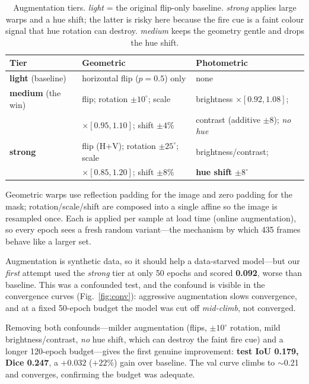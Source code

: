\documentclass[10pt]{article}
\begin{document}
\begin{table}[H]
\centering\small
\begin{tabular}{lll}
\toprule
Tier & Geometric & Photometric \\
\midrule
\textbf{light} (baseline) & horizontal flip ($p=0.5$) only & none \\
\textbf{medium} (the win) & flip; rotation $\pm10^\circ$; scale & brightness $\times[0.92,1.08]$; \\
 & $\times[0.95,1.10]$; shift $\pm4\%$ & contrast (additive $\pm8$); \emph{no hue} \\
\textbf{strong} & flip (H+V); rotation $\pm25^\circ$; scale & brightness/contrast; \\
 & $\times[0.85,1.20]$; shift $\pm8\%$ & \textbf{hue shift} $\pm8^\circ$ \\
\bottomrule
\end{tabular}
\caption{Augmentation tiers. \emph{light} = the original flip-only baseline.
\emph{strong} applies large warps and a hue shift; the latter is risky here
because the fire cue is a faint colour signal that hue rotation can destroy.
\emph{medium} keeps the geometry gentle and drops the hue shift.}
\label{tab:augtiers}
\end{table}

Geometric warps use reflection padding for the image and zero padding for the
mask; rotation/scale/shift are composed into a single affine so the image is
resampled once. Each is applied per sample at load time (online augmentation), so
every epoch sees a fresh random variant---the mechanism by which 435 frames
behave like a larger set.

Augmentation is synthetic data, so it should help a data-starved model---but our
\emph{first} attempt used the \emph{strong} tier at only 50 epochs and scored
\textbf{0.092}, worse than baseline. This was a confounded test, and the
confound is visible in the convergence curves (Fig.~\ref{fig:conv}): aggressive
augmentation slows convergence, and at a fixed 50-epoch budget the model was cut
off \emph{mid-climb}, not converged.

Removing both confounds---milder augmentation (flips, $\pm10^\circ$ rotation,
mild brightness/contrast, \emph{no} hue shift, which can destroy the faint fire
cue) and a longer 120-epoch budget---gives the first genuine improvement:
\textbf{test IoU 0.179, Dice 0.247}, a $+0.032$ ($+22\%$) gain over baseline.
The val curve climbs to $\sim$0.21 and converges, confirming the budget was
adequate.
\end{document}
